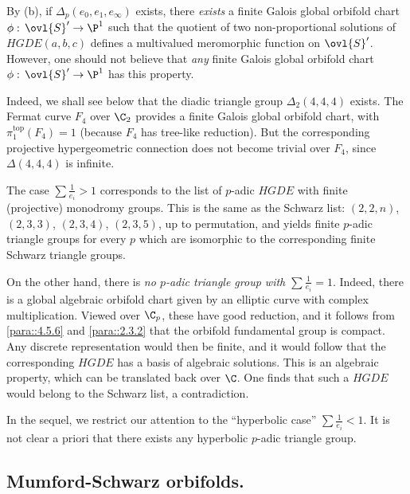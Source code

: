 \medskip{} By (b), if $\Delta_p(e_0,e_1,e_\infty)$
exists, there {\it exists} a finite Galois global 
orbifold chart $\phi:\,\ovl{S}' \to \P^1$ such that the quotient of two
non-proportional solutions of $ HGDE(a,b,c) $ 
defines a multivalued meromorphic function on $\ovl{S}'$. However, one
should not believe that {\it any} finite Galois 
global orbifold chart $\phi:\,\ovl{S}' \to \P^1$ has this property.

\noindent Indeed, we shall see below that the diadic triangle group
$\Delta_2(4,4,4)$ exists. The Fermat curve $F_4$ over 
$\C_2$ provides a finite Galois global orbifold chart, with
$\pi_1^{\mathrm{top}}(F_4)=1$ (because $F_4$ has tree-like reduction). 
But the corresponding projective hypergeometric connection does not
become trivial over $F_4$, since $\Delta(4,4,4)$ is 
infinite.  

\begin{para}\label{para::5.2.5} The case $\sum \frac{1}{e_i}>1$ corresponds
 to the list of $p$-adic $HGDE$ with finite (projective) monodromy
 groups. This is the same as the Schwarz list: $(2,2,n)$, $(2,3,3)$,
$(2,3,4)$, $(2,3,5)$, up to permutation, and yields finite $p$-adic
triangle groups for every $p$ which are isomorphic to the corresponding
finite Schwarz triangle groups.

\medskip\noindent On the other hand, there is {\it no $p$-adic triangle
 group with $\sum  \frac{1}{e_i}=1$}. Indeed, there is a global
 algebraic orbifold chart given by an elliptic curve with complex
 multiplication.  Viewed over $\C_p$, these have good reduction, and it
 follows from \ref{para::4.5.6} and \ref{para::2.3.2} that the orbifold
 fundamental group is 
 compact. Any discrete representation would then be finite, and it would
 follow that the corresponding $HGDE$ has a basis of algebraic
 solutions. This is an algebraic property, which can be translated back
 over $\C$. One finds that such a $HGDE$ would belong to the Schwarz
 list, a contradiction.

\medskip In the sequel, we restrict our attention to the ``hyperbolic
 case'' $\sum  \frac{1}{e_i}<1$. It is not clear a 
 priori that there exists any hyperbolic $p$-adic triangle group.
\end{para}

\subsection{Mumford-Schwarz orbifolds.}\label{sub::5.3}

